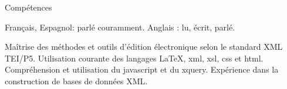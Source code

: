 











\begin{rubric}{Compétences}
                    \entry*
                    
                Français, Espagnol: parlé couramment. Anglais : lu, écrit,
                    parlé.
                    \entry*
                    
                Maîtrise des méthodes et outils d'édition électronique selon le standard
                    XML TEI/P5. Utilisation courante des langages LaTeX, xml, xsl, css et html.
                    Compréhension et utilisation du javascript et du xquery. Expérience dans la
                    construction de bases de données XML. \end{rubric}



